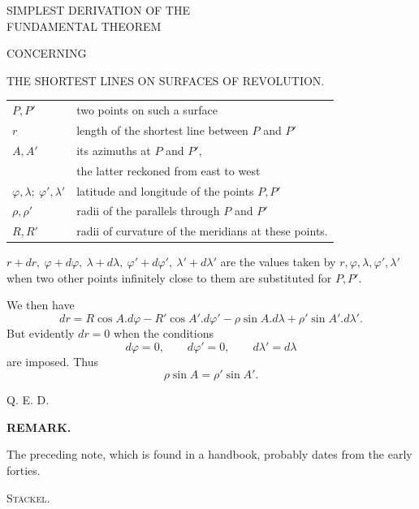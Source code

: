 \clearpage
{}
\begin{center}\large SIMPLEST DERIVATION OF THE\\FUNDAMENTAL THEOREM\end{center}
\begin{center}CONCERNING\end{center}
\begin{center}\large THE SHORTEST LINES ON SURFACES OF REVOLUTION.\end{center}
\begin{center}\begin{tabular}{lp{.73\linewidth}}
$P,P'$ & two points on such a surface\\
$r$ & length of the shortest line between $P$ and $P'$\\
$A,A'$ & its azimuths at $P$ and $P'$,\\
& the latter reckoned from east to west\\
$\varphi,\lambda;\ \varphi',\lambda'$ & latitude and longitude of the points $P,P'$\\
$\rho,\rho'$ & radii of the parallels through $P$ and $P'$\\
$R,R'$ & radii of curvature of the meridians at these points.
\end{tabular}\end{center}
\noindent $r+dr,\ \varphi+d\varphi,\ \lambda+d\lambda,\ \varphi'+d\varphi',\ \lambda'+d\lambda'$ are the values taken by $r,\varphi,\lambda,\varphi',\lambda'$ when two other points infinitely close to them are substituted for $P,P'$.

We then have
\[
dr=R\cos A.d\varphi-R'\cos A'.d\varphi'-\rho\sin A.d\lambda+\rho'\sin A'.d\lambda'.
\]
\noindent But evidently $dr=0$ when the conditions
\[
d\varphi=0,\qquad d\varphi'=0,\qquad d\lambda'=d\lambda
\]
\noindent are imposed. Thus
\[
\rho\sin A=\rho'\sin A'.
\]
\begin{flushright}Q. E. D.\end{flushright}
\begin{center}\textbf{REMARK.}\end{center}
\noindent\hspace*{1.2em}The preceding note, which is found in a handbook, probably dates from the early forties.
\begin{flushright}\textsc{Stäckel}.\end{flushright}

